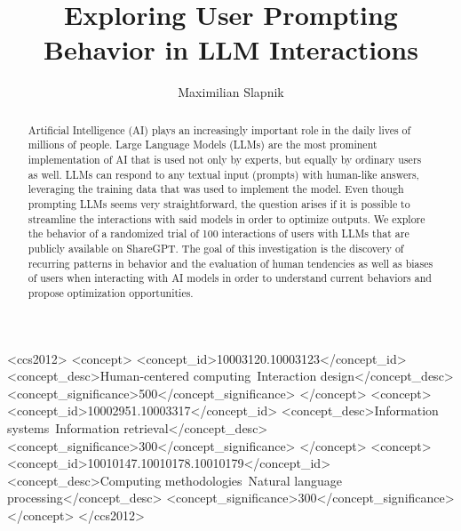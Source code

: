 \documentclass[sigconf]{acmart}
\begin{document}
\title[Prompting Behavior in LLM Interactions]{Exploring User Prompting Behavior in LLM Interactions}

\author{Maximilian Slapnik}



\begin{abstract}
  Artificial Intelligence (AI) plays an increasingly important role in the daily lives of millions of people.
  Large Language Models (LLMs) are the most prominent implementation of AI that is used not only by experts, but equally by ordinary users as well.
  LLMs can respond to any textual input (prompts) with human-like answers, leveraging the training data that was used to implement the model.
  Even though prompting LLMs seems very straightforward, the question arises if it is possible to streamline the interactions with said models in order to optimize outputs.
  We explore the behavior of a randomized trial of 100 interactions of users with LLMs that are publicly available on ShareGPT\@.
  The goal of this investigation is the discovery of recurring patterns in behavior and the evaluation of human tendencies as well as biases of users when interacting with AI models in order to understand current behaviors and propose optimization opportunities.
\end{abstract}


\begin{CCSXML}
  <ccs2012>
  <concept>
  <concept_id>10003120.10003123</concept_id>
  <concept_desc>Human-centered computing~Interaction design</concept_desc>
  <concept_significance>500</concept_significance>
  </concept>
  <concept>
  <concept_id>10002951.10003317</concept_id>
  <concept_desc>Information systems~Information retrieval</concept_desc>
  <concept_significance>300</concept_significance>
  </concept>
  <concept>
  <concept_id>10010147.10010178.10010179</concept_id>
  <concept_desc>Computing methodologies~Natural language processing</concept_desc>
  <concept_significance>300</concept_significance>
  </concept>
  </ccs2012>
\end{CCSXML}
\end{document}
